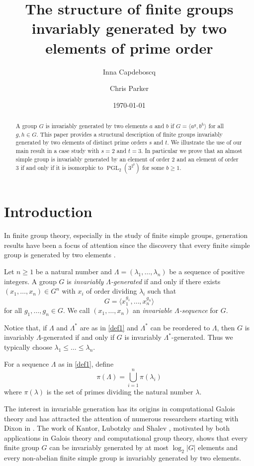 \documentclass[12pt,a4paper]{amsart}
\title[Invariably generated groups]{The structure of finite groups invariably generated by two elements of prime order}
\author{Inna   Capdeboscq}\author{Chris Parker}
\date{\today}
\DeclareMathOperator{\PGL}{PGL}
\begin{document}
\maketitle

\begin{abstract}
A group $G$ is invariably generated by   two elements $a$ and $b$ if $G=\langle a^g,b^h\rangle $ for all $g,h\in G$. This paper  provides a  structural description of finite groups invariably generated by two elements of distinct prime orders $s$ and $t$.
We   illustrate the use of our main result in a case study
with $s=2$ and $t=3$. In particular we prove that an almost simple  group is invariably  generated by an element of order $2$ and an element of order $3$  if and only if it is isomorphic to $\PGL_2(3^{2^b})$ for some $b \ge 1$.   
\end{abstract}


\section{Introduction}


In finite group theory, especially in the study of finite simple groups, generation results have been a focus of attention since the discovery  that every finite simple group is generated by two elements   \cite{aschbacher1984some,steinberg1962generators}.

\begin{definition}\label{def1}
 Let $n \ge 1$ be a natural number and $\Lambda=  (\lambda_1,\dots,\lambda_n )$ be a sequence    of positive integers. A group $G$ is \emph{invariably $\Lambda$-generated} if and only if  there exists   $(x_1, \dots ,x_n) \in G^n$ with $x_i$ of order dividing $\lambda_i$ such that $$G=\langle x_1^{g_1},\dots,x_n^{g_n}\rangle$$ for all $g_1,\dots, g_n \in G$. We call $(x_1, \dots, x_n)$ an \emph{invariable  $\Lambda$-sequence} for $G$.
\end{definition}

Notice that, if $\Lambda$  and $\Lambda^*$ are as in \cref{def1} and $\Lambda^*$  can be reordered to $\Lambda$, then   $G$ is invariably $\Lambda$-generated if and only if $G$ is  invariably $\Lambda^*$-generated. Thus we typically choose  $\lambda_1 \le \dots\le\lambda_n$.


For a   sequence $\Lambda$ as in \cref{def1}, define $$\pi(\Lambda)=\bigcup_{i=1}^n \pi(\lambda_i)$$ where $\pi(\lambda)$ is the set of primes dividing the natural number $\lambda$.


The interest in invariable generation has its origins in computational Galois theory  and has attracted the attention of numerous researchers starting with Dixon in  \cite{MR1180190}.
The work of Kantor, Lubotzky and Shalev \cite[Theorems 1.1 and  1.3]{MR2852243},  motivated by both applications in Galois theory and  computational group theory,  shows that every finite group $G$ can be invariably generated by at most $\log_2|G|$ elements and every non-abelian finite simple group is invariably generated by two elements.
\end{document}
